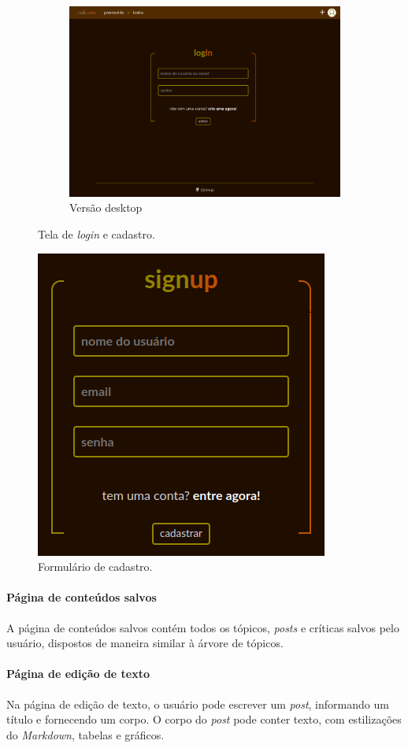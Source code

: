 \begin{figure}[hbt!]
\begin{subfigure}{.7\textwidth}
  \centering
  \includegraphics[width=0.9\linewidth]{imagens/captures/login.png}
  \caption{Versão desktop}
\end{subfigure}
\caption{Tela de \textit{login} e cadastro.}
\label{fig:login}
\end{figure}

\begin{figure}[hbt!]
\centering
\includegraphics[width=0.275\linewidth]{imagens/captures/signup.png}
\caption{Formulário de cadastro.}
\label{fig:signup}
\end{figure}

\paragraph{Página de conteúdos salvos}
A página de conteúdos salvos contém todos os tópicos, \textit{posts} e críticas salvos pelo usuário, dispostos de maneira similar à árvore de tópicos.

\paragraph{Página de edição de texto}
Na página de edição de texto, o usuário pode escrever um \textit{post}, informando um título e fornecendo um corpo. O corpo do \textit{post} pode conter texto, com estilizações do \textit{Markdown}, tabelas e gráficos.

\clearpage